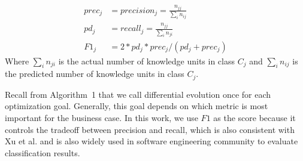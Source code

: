 \documentclass[sigconf,review, anonymous]{acmart}
\theoremstyle{break}
\begin{document}
{\[
\begin{array}{ll}
prec_j &= precision_j = \frac{n_{jj}}{\sum_{i}n_{ij}}\\
pd_j &= recall_j = \frac{n_{jj}}{\sum_{i}n_{ji}}\\ 
F1_{j} &= 2*pd_j*prec_j/(pd_j + prec_j)
\end{array}
\]}
Where ${\sum_{i}n_{ji}}$ is the actual number of knowledge units in class $C_j$
and $\sum_{i}n_{ij}$ is the predicted number of knowledge units in class $C_j$.


Recall from Algorithm~1 that we call differential evolution once for each
optimization goal. Generally, this goal depends on which metric is most important for
the business case. In this work, we use $F1$ as the score because it controls
the tradeoff between precision and recall, which is also consistent with Xu et al.\cite{xu2016predicting}
and is also widely used in software engineering
community to evaluate classification results\cite{wang2016automatically,menzies2007data,fu2016tuning,kim2008classifying}.


\begin{table}[!htp]
\centering
\caption{Comparison of our baseline method with Xu et al's }
\label{tab:baseline}
\end{table}
\end{document}
